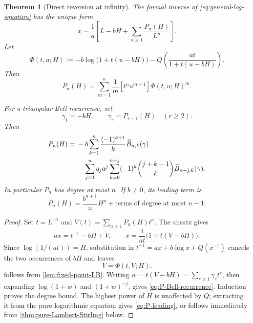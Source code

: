 \documentclass[11pt,a4paper]{article}
\numberwithin{equation}{section}
\newtheorem{theorem}{Theorem}[section]
\theoremstyle{definition}
\theoremstyle{remark}
\begin{document}
\begin{theorem}[Direct reversion at infinity]\label{thm:direct-reversion}
The formal inverse of \cref{eq:general-log-equation} has the unique form
\begin{equation}\label{eq:direct-ansatz}
 x\sim\frac1a\left[
 L-bH+\sum_{n\ge1}\frac{P_n(H)}{L^n}
 \right].
\end{equation}
Let
\begin{equation}\label{eq:Phi-direct}
 \Phi(t,u;H):=-b\log\bigl(1+t(u-bH)\bigr)
 -Q\!\left(\frac{at}{1+t(u-bH)}\right).
\end{equation}
Then
\begin{equation}\label{eq:P-Lagrange}
 P_n(H)=\sum_{m=1}^n\frac1m
 [t^nu^{m-1}]\Phi(t,u;H)^m.
\end{equation}

For a triangular Bell recurrence, set
\begin{equation}\label{eq:gamma-direct}
 \gamma_1=-bH,
 \qquad \gamma_r=P_{r-1}(H)\quad(r\ge2).
\end{equation}
Then
\begin{align}
 P_n(H)={}&-b\sum_{k=1}^n\frac{(-1)^{k+1}}{k}
             \widehat B_{n,k}(\gamma)\notag\\
 &-\sum_{j=1}^nq_ja^j
   \sum_{k=0}^{n-j}(-1)^k\binom{j+k-1}{k}
             \widehat B_{n-j,k}(\gamma).
 \label{eq:P-Bell-recurrence}
\end{align}
In particular \(P_n\) has degree at most \(n\).  If \(b\ne0\), its leading
term is
\begin{equation}\label{eq:P-leading}
 P_n(H)=\frac{b^{n+1}}{n}H^n+\text{terms of degree at most }n-1.
\end{equation}
\end{theorem}

\begin{proof}
Set \(t=L^{-1}\) and \(V(t)=\sum_{n\ge1}P_n(H)t^n\).  The ansatz gives
\[
 ax=t^{-1}-bH+V,
 \qquad
 x=\frac1{at}\bigl(1+t(V-bH)\bigr).
\]
Since \(\log(1/(at))=H\), substitution in
\(t^{-1}=ax+b\log x+Q(x^{-1})\) cancels the two occurrences of \(bH\) and
leaves
\[
 V=\Phi(t,V;H).
\]
 follows from
\cref{lem:fixed-point-LB}.  Writing
\(w=t(V-bH)=\sum_{r\ge1}\gamma_rt^r\), then expanding
\(\log(1+w)\) and \((1+w)^{-j}\), gives
\cref{eq:P-Bell-recurrence}.  Induction proves the degree bound.  The
highest power of \(H\) is unaffected by \(Q\); extracting it from the pure
logarithmic equation gives \cref{eq:P-leading}, or follows immediately from
\cref{thm:pure-Lambert-Stirling} below.
\end{proof}
\end{document}
